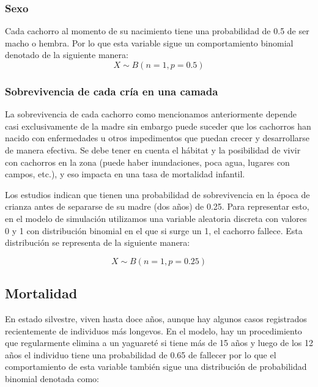         \subsubsection{Sexo}
            Cada cachorro al momento de su nacimiento tiene una probabilidad de 0.5 de ser macho o hembra. Por lo que esta variable sigue un comportamiento binomial denotado de la siguiente manera:
            \begin{equation}
                X \sim B(n=1, p=0.5)
            \end{equation}
        \subsubsection{Sobrevivencia de cada cría en una camada}
            La sobrevivencia de cada cachorro como mencionamos anteriormente depende casi exclusivamente de la madre sin embargo puede suceder que los cachorros han nacido con enfermedades u otros impedimentos que puedan crecer y desarrollarse de manera efectiva. Se debe tener en cuenta el hábitat y la posibilidad de vivir con cachorros en la zona (puede haber inundaciones, poca agua, lugares con campos, etc.), y eso impacta en una tasa de mortalidad infantil.
            
            Los estudios indican que tienen una probabilidad de sobrevivencia en la época de crianza antes de separarse de su madre (dos años) de 0.25. Para representar esto, en el modelo de simulación utilizamos una variable aleatoria discreta con valores 0 y 1 con distribución binomial en el que si surge un 1, el cachorro fallece. Esta distribución se representa de la siguiente manera:

            \begin{equation}
                X \sim B(n=1, p=0.25)
            \end{equation}
            
    \subsection{Mortalidad}
        En estado silvestre, viven hasta doce años, aunque hay algunos casos registrados recientemente de individuos más longevos. En el modelo, hay un procedimiento que regularmente elimina a un yaguareté si tiene más de 15 años y luego de los 12 años el individuo tiene una probabilidad de 0.65 de fallecer por lo que el comportamiento de esta variable también sigue una distribución de probabilidad binomial denotada como:
        
